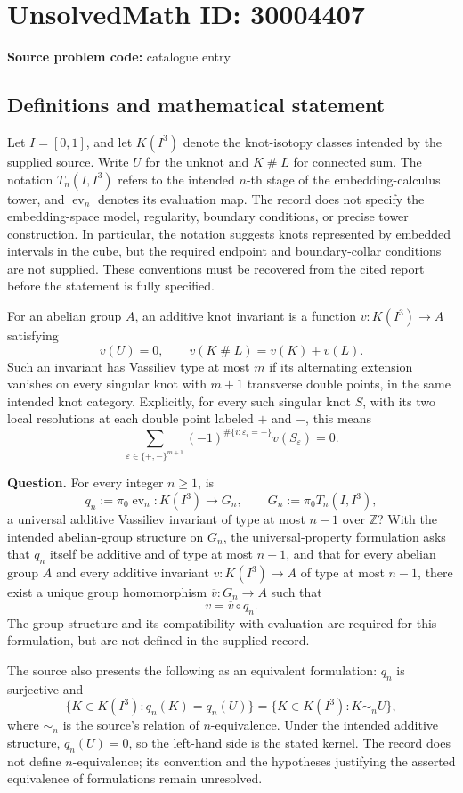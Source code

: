 \documentclass[11pt]{article}
\begin{document}
\section*{UnsolvedMath ID: 30004407}
\textbf{Source problem code:} catalogue entry
\subsection{Definitions and mathematical statement}
Let \(I=[0,1]\), and let \(K(I^3)\) denote the knot-isotopy classes intended by the supplied source. Write \(U\) for the unknot and \(K\mathbin{\#}L\) for connected sum. The notation \(T_n(I,I^3)\) refers to the intended \(n\)-th stage of the embedding-calculus tower, and \(\operatorname{ev}_n\) denotes its evaluation map. The record does not specify the embedding-space model, regularity, boundary conditions, or precise tower construction. In particular, the notation suggests knots represented by embedded intervals in the cube, but the required endpoint and boundary-collar conditions are not supplied. These conventions must be recovered from the cited report before the statement is fully specified.

For an abelian group \(A\), an additive knot invariant is a function \(v:K(I^3)\to A\) satisfying
\[
v(U)=0,\qquad v(K\mathbin{\#}L)=v(K)+v(L).
\]
Such an invariant has Vassiliev type at most \(m\) if its alternating extension vanishes on every singular knot with \(m+1\) transverse double points, in the same intended knot category. Explicitly, for every such singular knot \(S\), with its two local resolutions at each double point labeled \(+\) and \(-\), this means
\[
\sum_{\varepsilon\in\{+,-\}^{m+1}}
(-1)^{\#\{i:\varepsilon_i=-\}}v(S_\varepsilon)=0.
\]

\textbf{Question.} For every integer \(n\geq1\), is
\[
q_n:=\pi_0\operatorname{ev}_n:
K(I^3)\longrightarrow G_n,
\qquad G_n:=\pi_0T_n(I,I^3),
\]
a universal additive Vassiliev invariant of type at most \(n-1\) over \(\mathbb Z\)? With the intended abelian-group structure on \(G_n\), the universal-property formulation asks that \(q_n\) itself be additive and of type at most \(n-1\), and that for every abelian group \(A\) and every additive invariant \(v:K(I^3)\to A\) of type at most \(n-1\), there exist a unique group homomorphism \(\overline v:G_n\to A\) such that
\[
v=\overline v\circ q_n.
\]
The group structure and its compatibility with evaluation are required for this formulation, but are not defined in the supplied record.

The source also presents the following as an equivalent formulation: \(q_n\) is surjective and
\[
\{K\in K(I^3):q_n(K)=q_n(U)\}
=
\{K\in K(I^3):K\sim_n U\},
\]
where \(\sim_n\) is the source's relation of \(n\)-equivalence. Under the intended additive structure, \(q_n(U)=0\), so the left-hand side is the stated kernel. The record does not define \(n\)-equivalence; its convention and the hypotheses justifying the asserted equivalence of formulations remain unresolved.
\end{document}
